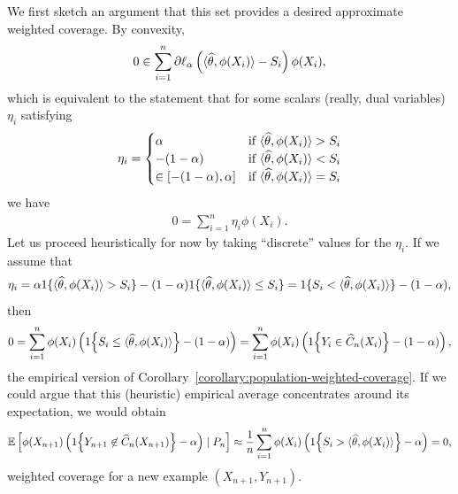 \documentclass[11pt]{article}
\newcommand{\loss}{\ell}
\newcommand{\scorerv}{S}
\begin{document}
We first sketch an argument that this set provides a desired approximate
weighted coverage.
%
By convexity,
\begin{align*}
  0 \in \sum_{i = 1}^n \partial \loss_\alpha\left(
  \<\what{\theta}, \phi(X_i)\>
  - \scorerv_i\right) \phi(X_i),
\end{align*}
which is equivalent to the statement that for
some scalars (really, dual variables) $\eta_i$ satisfying
\begin{equation}
  \label{eqn:g-gradient-calcs}
  \eta_i = \begin{cases}
    \alpha & \mbox{if}~ \<\what{\theta}, \phi(X_i)\> > \scorerv_i \\
    -(1 - \alpha) & \mbox{if}~ \<\what{\theta}, \phi(X_i)\> < \scorerv_i \\
    \in [-(1 - \alpha), \alpha]
    & \mbox{if}~ \<\what{\theta}, \phi(X_i)\> = \scorerv_i
  \end{cases}
\end{equation}
we have
\begin{align*}
  0 = \sum_{i = 1}^n \eta_i \phi(X_i).
\end{align*}
Let us proceed heuristically for now by taking ``discrete'' values for the
$\eta_i$.
%
If we assume that
\begin{equation*}
  \eta_i =
  \alpha \indics{\<\what{\theta}, \phi(X_i)\> > \scorerv_i}
  - (1 - \alpha) \indics{\<\what{\theta}, \phi(X_i)\> \le \scorerv_i}
  = \indics{\scorerv_i < \<\what{\theta}, \phi(X_i)\>}
  - (1 - \alpha),
\end{equation*}
then
\begin{equation*}
  0 = \sum_{i = 1}^n
  \phi(X_i) \left(\indic{\scorerv_i \le \<\what{\theta}, \phi(X_i)\>}
  -  (1 - \alpha)\right)
  = \sum_{i = 1}^n
  \phi(X_i) \left(\indic{Y_i \in \what{C}_n(X_i)}
  -  (1 - \alpha)\right),
\end{equation*}
the empirical version of
Corollary~\ref{corollary:population-weighted-coverage}.
%
If we could argue that this (heuristic)
empirical average concentrates around its expectation,
we would obtain
\begin{equation*}
  \E\left[\phi(X_{n + 1}) \left(\indic{Y_{n + 1} \not\in \what{C}_n(X_{n+1})}
    - \alpha\right) \mid P_n\right]
  \approx \frac{1}{n}
  \sum_{i = 1}^n \phi(X_i)
  \left(\indic{\scorerv_i > \<\what{\theta}, \phi(X_i)\>}
  -  \alpha\right)
  = 0,
\end{equation*}
weighted coverage for a new example $(X_{n + 1}, Y_{n + 1})$.

\newcommand{\ballphi}{\ball_\phi}
\end{document}
